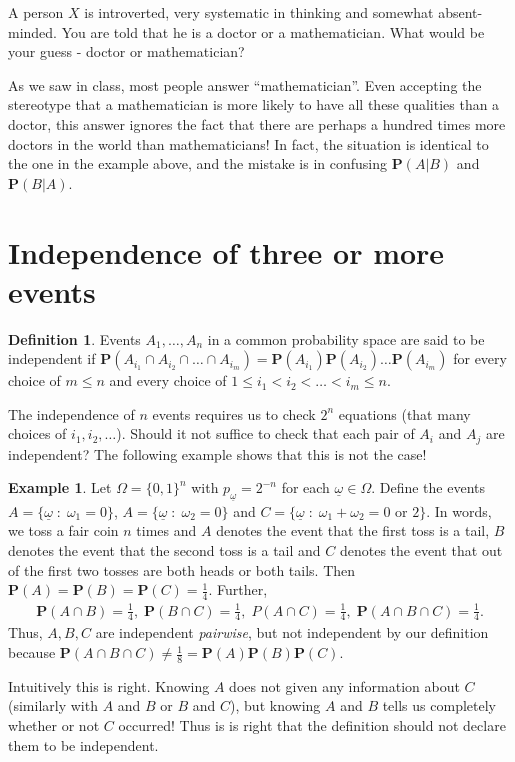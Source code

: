 \documentclass[preprint,  11pt]{amsart}
\newcommand{\para}[1]{\vspace{4mm}\noindent{\bfseries #1:}}
\def\ome{\omega}
\theoremstyle{plain} %
\theoremstyle{definition} %
\newtheorem{definition}[theorem]{Definition}
\newtheorem{example}[theorem]{Example}
\begin{document}
\para{Question} A person $X$ is introverted,  very systematic in thinking and somewhat absent-minded. You are told that he is a doctor or a mathematician. What would be your guess - doctor or mathematician?

As we saw in class, most people answer ``mathematician''. Even accepting the stereotype that a mathematician is more likely to have all these qualities than a doctor, this answer ignores the fact that there are perhaps a hundred times more doctors in the world than mathematicians! In fact, the situation is identical to the one in the example above, and the mistake is in confusing $\mathbf{P}(A\big| B)$ and $\mathbf{P}(B\big| A)$.


\section{Independence of three or more events} 
\begin{definition} Events $A_{1},\ldots ,A_{n}$ in a common probability space are said to be independent if
$
\mathbf{P}\left(A_{i_{1}}\cap A_{i_{2}}\cap \ldots \cap A_{i_{m}}\right)=\mathbf{P}(A_{i_{1}})\mathbf{P}(A_{i_{2}})\ldots \mathbf{P}(A_{i_{m}})$ for every choice of $m\le n$ and every choice of $1\le i_{1}<i_{2}<\ldots <i_{m}\le n$.
\end{definition}
 The independence of $n$ events requires us to check $2^{n}$ equations (that many choices of $i_{1},i_{2},\ldots$). Should it not suffice to check that each pair of $A_{i}$ and $A_{j}$ are independent? The following example shows that this is not the case!
\begin{example} Let $\Omega=\{0,1\}^{n}$ with $p_{\underline{\ome}}=2^{-n}$ for each $\underline{\ome}\in \Omega$. Define the events $A=\{\underline{\ome}{\; : \;} \omega_{1}=0\}$, $A=\{\underline{\ome}{\; : \;} \omega_{2}=0\}$ and $C=\{\underline{\ome}{\; : \;} \omega_{1}+\omega_{2}=0 \mbox{ or }2\}$. In words, we toss a fair coin $n$ times and $A$ denotes the event that the first toss is a tail, $B$ denotes the event that the second toss is a tail and $C$ denotes the event that out of the first two tosses are both heads or both tails. Then $\mathbf{P}(A)=\mathbf{P}(B)=\mathbf{P}(C)=\frac{1}{4}$. Further, 
\[\begin{aligned}
\mathbf{P}(A\cap B)=\frac{1}{4}, \; \mathbf{P}(B\cap C)=\frac{1}{4}, \; P(A\cap C)=\frac{1}{4}, \; \mathbf{P}(A\cap B\cap C)=\frac{1}{4}.
\end{aligned}\]
Thus,  $A,B,C$ are independent {\em pairwise}, but not independent by our definition because $\mathbf{P}(A\cap B\cap C)\not= \frac{1}{8}=\mathbf{P}(A)\mathbf{P}(B)\mathbf{P}(C)$.

Intuitively this is right. Knowing $A$ does not given any information about $C$ (similarly with $A$ and $B$ or $B$ and $C$), but knowing $A$ and $B$ tells us completely whether or not $C$ occurred! Thus is is right that the definition should not declare them to be independent.
\end{example}
\end{document}
